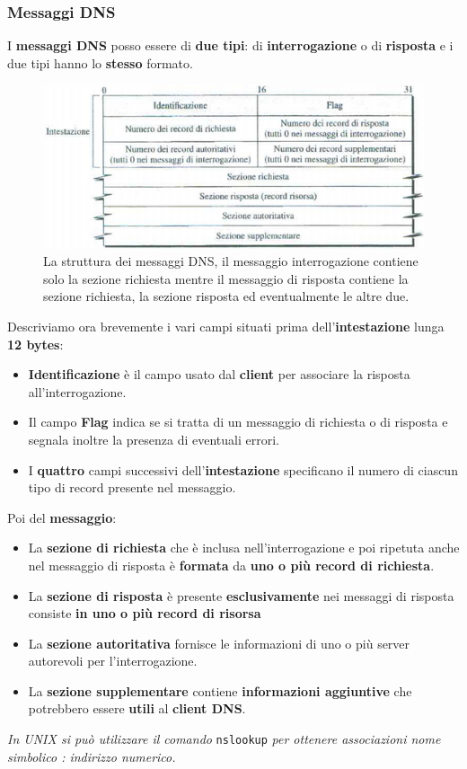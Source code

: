 \documentclass[11pt,a4paper,oneside]{book}
\theoremstyle{definition}
\begin{document}
\subsubsection{Messaggi DNS}
I \textbf{messaggi DNS} posso essere di \textbf{due tipi}: di \textbf{interrogazione} o di \textbf{risposta} e i due tipi hanno lo \textbf{stesso} formato.
\begin{figure}[!h]
	\includegraphics[scale=0.6]{Immagini/DNSmessage.png}
	\centering
	\caption{La struttura dei messaggi DNS, il messaggio interrogazione contiene solo la sezione richiesta mentre il messaggio di risposta contiene la sezione richiesta, la sezione risposta ed eventualmente le altre due.}
\end{figure}\newline
Descriviamo ora brevemente i vari campi situati prima dell'\textbf{intestazione} lunga \textbf{12 bytes}:
\begin{itemize}
	\item \textbf{Identificazione} è il campo usato dal \textbf{client} per associare la risposta all'interrogazione.
	\item Il campo \textbf{Flag} indica se si tratta di un messaggio di richiesta o di risposta e segnala inoltre la presenza di eventuali errori.
	\item I \textbf{quattro} campi successivi dell'\textbf{intestazione} specificano il numero di ciascun tipo di record presente nel messaggio.
\end{itemize}
Poi del \textbf{messaggio}:
\begin{itemize}
	\item La \textbf{sezione di richiesta} che è inclusa nell'interrogazione e poi ripetuta anche nel messaggio di risposta è \textbf{formata} da\textbf{ uno o più record di richiesta}.
	\item La \textbf{sezione di risposta} è presente \textbf{esclusivamente} nei messaggi di risposta consiste \textbf{in uno o più record di risorsa}
	\item La \textbf{sezione autoritativa} fornisce le informazioni di uno o più server autorevoli per l'interrogazione.
	\item La \textbf{sezione supplementare} contiene \textbf{informazioni aggiuntive} che potrebbero essere \textbf{utili} al \textbf{client DNS}.
\end{itemize}
\textit{In UNIX si può utilizzare il comando} \texttt{nslookup} \textit{per ottenere associazioni nome simbolico : indirizzo numerico.}
\end{document}
